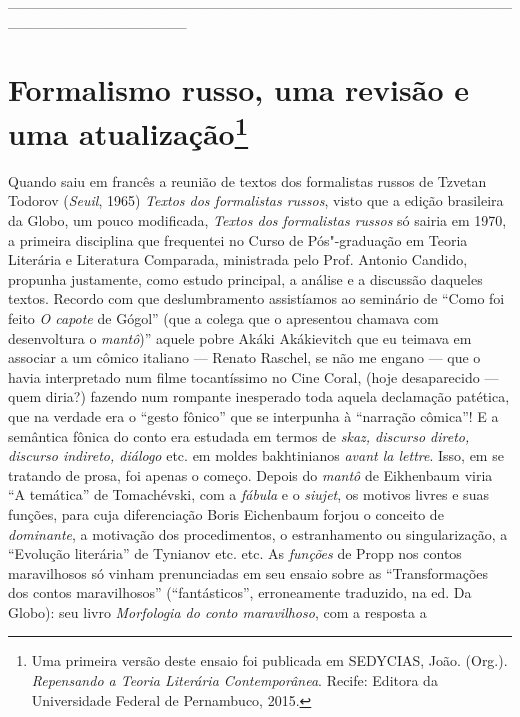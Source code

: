 \_\_\_\_\_\_\_\_\_\_\_\_\_\_\_\_\_\_\_\_\_\_\_\_\_\_\_\_\_\_\_\_\_\_\_\_\_\_\_\_\_\_\_\_\_\_\_\_\_\_\_\_\_\_\_\_\_\_\_\_\_\_\_\_\_

\chapter{Formalismo russo, uma revisão e uma atualização\footnote{Uma
  primeira versão deste ensaio foi publicada em SEDYCIAS, João. (Org.).
  \emph{Repensando a Teoria Literária Contemporânea}. Recife: Editora da
  Universidade Federal de Pernambuco, 2015.}}

Quando saiu em francês a reunião de textos dos formalistas russos de
Tzvetan Todorov (\emph{Seuil}, 1965) \emph{Textos dos formalistas
russos}, visto que a edição brasileira da Globo, um pouco modificada,
\emph{Textos dos formalistas russos} só sairia em 1970, a primeira
disciplina que frequentei no Curso de Pós"-graduação em Teoria Literária
e Literatura Comparada, ministrada pelo Prof. Antonio Candido, propunha
justamente, como estudo principal, a análise e a discussão daqueles
textos. Recordo com que deslumbramento assistíamos ao seminário de
``Como foi feito \emph{O capote} de Gógol'' (que a colega que o
apresentou chamava com desenvoltura o \emph{mantô})'' aquele pobre Akáki
Akákievitch que eu teimava em associar a um cômico italiano --- Renato
Raschel, se não me engano --- que o havia interpretado num filme
tocantíssimo no Cine Coral, (hoje desaparecido --- quem diria?) fazendo num rompante inesperado toda aquela declamação patética, que na
verdade era o ``gesto fônico'' que se interpunha à ``narração cômica''!
E a semântica fônica do conto era estudada em termos de \emph{skaz,
discurso direto, discurso indireto, diálogo} etc. em moldes bakhtinianos
\emph{avant la lettre}. Isso, em se tratando de prosa, foi apenas o começo.
Depois do \emph{mantô} de Eikhenbaum viria ``A temática'' de
Tomachévski, com a \emph{fábula} e o \emph{siujet}, os motivos livres e
suas funções, para cuja diferenciação Boris Eichenbaum forjou o conceito
de \emph{dominante}, a motivação dos procedimentos, o estranhamento ou
singularização, a ``Evolução literária'' de Tynianov etc. etc. As
\emph{funções} de Propp nos contos maravilhosos só vinham prenunciadas
em seu ensaio sobre as ``Transformações dos contos maravilhosos''
(``fantásticos'', erroneamente traduzido, na ed. Da Globo): seu livro
\emph{Morfologia do conto maravilhoso}, com a resposta a
